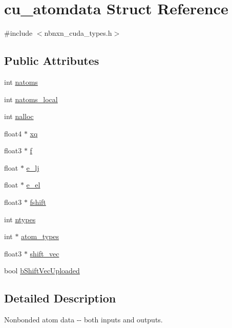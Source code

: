 \hypertarget{structcu__atomdata}{\section{cu\-\_\-atomdata \-Struct \-Reference}
\label{structcu__atomdata}
}


{\ttfamily \#include $<$nbnxn\-\_\-cuda\-\_\-types.\-h$>$}

\subsection*{\-Public \-Attributes}
\begin{DoxyCompactItemize}
\item 
int \hyperlink{structcu__atomdata_a7fe7755b4d14f44ad3a5211cb8adc347}{natoms}
\item 
int \hyperlink{structcu__atomdata_a6c0d5aa24a31f54aebdd855e1bd27a42}{natoms\-\_\-local}
\item 
int \hyperlink{structcu__atomdata_aed8b908047211f3c3b769496a68fcba8}{nalloc}
\item 
float4 $\ast$ \hyperlink{structcu__atomdata_af5184dc214449df1ddfbf7c1bdbea5b7}{xq}
\item 
float3 $\ast$ \hyperlink{structcu__atomdata_af8dab044dea5a5c6cf2a43127e658484}{f}
\item 
float $\ast$ \hyperlink{structcu__atomdata_a2b398850ed9c1eb7893893e85684ae9b}{e\-\_\-lj}
\item 
float $\ast$ \hyperlink{structcu__atomdata_a74e3b3a9d7f7425a08fd5afe1ee13a17}{e\-\_\-el}
\item 
float3 $\ast$ \hyperlink{structcu__atomdata_a5d6e7f465471e06bad3f49c3f2f75892}{fshift}
\item 
int \hyperlink{structcu__atomdata_a85c5eb52f290ea2b1a15237272904988}{ntypes}
\item 
int $\ast$ \hyperlink{structcu__atomdata_a933f973e308cf4847bfef5e9cef098dc}{atom\-\_\-types}
\item 
float3 $\ast$ \hyperlink{structcu__atomdata_a57c5b2b6b9cbbe3314394b745c3114ef}{shift\-\_\-vec}
\item 
bool \hyperlink{structcu__atomdata_a6aa24ad49612d99e52ae43676af1c3ba}{b\-Shift\-Vec\-Uploaded}
\end{DoxyCompactItemize}


\subsection{\-Detailed \-Description}
\-Nonbonded atom data -\/-\/ both inputs and outputs. 

